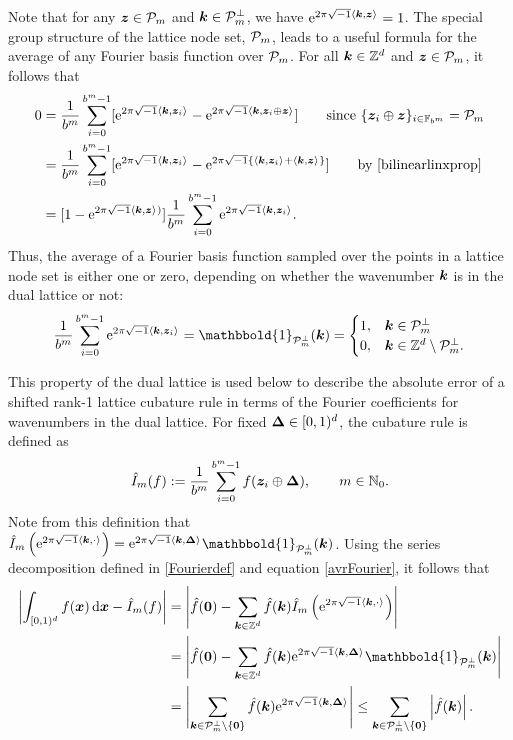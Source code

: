 \documentclass[graybox]{svmult}
\newcommand{\Z}{\mathbb{Z}} %
\newcommand{\N}{\mathbb{N}} %
\newcommand{\F}{\mathbb{F}} %
\newcommand{\bszero}{\boldsymbol{0}} %
\newcommand{\bsx}{\boldsymbol{x}}    %
\newcommand{\bsz}{\boldsymbol{z}}    %
\newcommand{\bsDelta}{\boldsymbol{\Delta}}    %
\newcommand{\ind}{\mathbbold{1}}
\begin{document}
Note that for any $\bsz\in\cp_m$ and $\boldsymbol{k}\in\mathcal{P}_m^\perp$, we have $\E^{2 \pi \sqrt{-1} \ip{\bsk}{\bsz}}=1$. The special group structure of the  lattice node set, $\mathcal{P}_m$, leads to a useful formula for the average of any Fourier basis function over $\mathcal{P}_m$. For all $\bsk \in \Z^d$ and $\bsz \in \cp_m$, it follows that
\begin{align*}
\nonumber
0 &
= \frac{1}{b^m} \sum_{i=0}^{b^m-1} [\E^{2 \pi \sqrt{-1} \ip{\bsk}{\bsz_i}} - \E^{2 \pi \sqrt{-1} \ip{\bsk}{\bsz_i \oplus \bsz}}] \qquad \text{since } \{\bsz_i \oplus \bsz\}_{i \in \F_{b^m}} = \cp_m\\
\nonumber
& = \frac{1}{b^m} \sum_{i=0}^{b^m-1} [\E^{2 \pi \sqrt{-1} \ip{\bsk}{\bsz_i}} - \E^{2 \pi \sqrt{-1} \{\ip{\bsk}{\bsz_i}+\ip{\bsk}{\bsz}\}}] \qquad \text{by } \eqref{bilinearlinxprop}\\
\label{sumeq}
& = [1 - \E^{2 \pi \sqrt{-1} \ip{\bsk}{\bsz})}] \frac{1}{b^m} \sum_{i=0}^{b^m-1} \E^{2 \pi \sqrt{-1} \ip{\bsk}{\bsz_i}}.
\end{align*}
Thus, the average of a Fourier basis function sampled over the points in a lattice node set is either one or zero, depending on whether the wavenumber $\boldsymbol{k}$ is in the dual lattice or not:
\begin{equation}\label{avrFourier}
\frac{1}{b^m} \sum_{i=0}^{b^m-1} \E^{2 \pi \sqrt{-1} \ip{\bsk}{\bsz_i}} = \ind_{\cp_m^{\perp}}(\bsk) = \begin{cases} 1 , & \bsk \in \cp_m^{\perp}\\
 0,  & \bsk \in \Z^d \setminus \cp_m^{\perp}.
 \end{cases}
\end{equation}

This property of the dual lattice is used below to describe the absolute error of a shifted rank-1 lattice cubature rule in terms of the Fourier coefficients for wavenumbers in the dual lattice. For fixed $\bsDelta \in \cube$, the cubature rule is defined as
\begin{equation} \label{cubaturedef}
\hI_m(f) := \frac{1}{b^m} \sum_{i=0}^{b^m-1} f(\bsz_i \oplus\bsDelta),  \qquad  m \in \N_0.
\end{equation}
Note from this definition that $\hI_m\left(\E^{2 \pi \sqrt{-1} \ip{\bsk}{\cdot}}\right)= \E^{2 \pi \sqrt{-1} \ip{\bsk}{\bsDelta}}\ind_{\cp_m^{\perp}}(\bsk)$. Using the series decomposition defined in \eqref{Fourierdef} and equation \eqref{avrFourier}, it follows that
\begin{align}
\nonumber
\biggabs{ \int_{\cube} f(\bsx) \, \D \bsx - \hI_m(f)} 
& = \Biggabs {\hf(\bszero) - \sum_{\bsk \in \Z^d} \hf(\bsk) \hI_m\left(\E^{2 \pi \sqrt{-1} \ip{\bsk}{\cdot}}\right)} \\
\nonumber
& = \Biggabs {\hf(\bszero) - \sum_{\bsk \in \Z^d} \hf(\bsk) \E^{2 \pi \sqrt{-1} \ip{\bsk}{\bsDelta}} \ind_{\cp_m^{\perp}}(\bsk)  } \\ 
& = \Biggabs {\sum_{\bsk \in \cp_m^{\perp}\setminus \{\bszero\} } \hf(\bsk)  \E^{2 \pi \sqrt{-1} \ip{\bsk}{\bsDelta}} } \le \sum_{\bsk \in \cp_m^{\perp}\setminus \{\bszero\} } \abs{\hf(\bsk)}. \label{err1}
\end{align}
\end{document}
